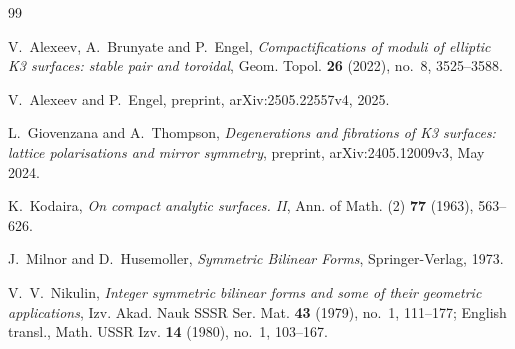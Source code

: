 \documentclass[12pt]{article}
\theoremstyle{plain}
\theoremstyle{definition}
\begin{document}
\begin{thebibliography}{99}

V.~Alexeev, A.~Brunyate and P.~Engel,
\emph{Compactifications of moduli of elliptic {K3} surfaces: stable pair and toroidal},
Geom. Topol. \textbf{26} (2022), no.~8, 3525--3588.

V.~Alexeev and P.~Engel,
preprint, arXiv:2505.22557v4, 2025.

L.~Giovenzana and A.~Thompson,
\emph{Degenerations and fibrations of {K3} surfaces: lattice polarisations and mirror symmetry},
preprint, arXiv:2405.12009v3, May 2024.

K.~Kodaira,
\emph{On compact analytic surfaces. {II}},
Ann. of Math. (2) \textbf{77} (1963), 563--626.

J.~Milnor and D.~Husemoller,
\emph{Symmetric Bilinear Forms},
Springer-Verlag, 1973.

V.~V.~Nikulin,
\emph{Integer symmetric bilinear forms and some of their geometric applications},
Izv. Akad. Nauk SSSR Ser. Mat. \textbf{43} (1979), no.~1, 111--177; English transl., Math. USSR Izv. \textbf{14} (1980), no.~1, 103--167.

\end{thebibliography}
\end{document}
